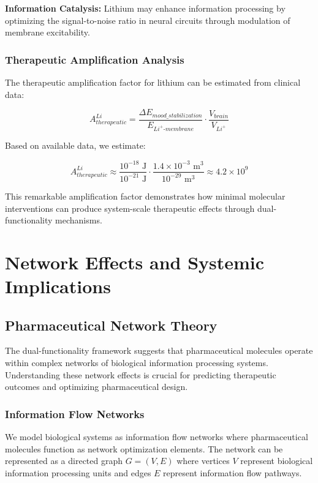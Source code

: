 \documentclass[12pt,a4paper]{article}
\begin{document}
\textbf{Information Catalysis:} Lithium may enhance information processing by optimizing the signal-to-noise ratio in neural circuits through modulation of membrane excitability.

\subsubsection{Therapeutic Amplification Analysis}

The therapeutic amplification factor for lithium can be estimated from clinical data:

$$A_{therapeutic}^{Li} = \frac{\Delta E_{mood\_stabilization}}{E_{Li^+ \text{-}membrane}} \cdot \frac{V_{brain}}{V_{Li^+}}$$

Based on available data, we estimate:

$$A_{therapeutic}^{Li} \approx \frac{10^{-18} \text{ J}}{10^{-21} \text{ J}} \cdot \frac{1.4 \times 10^{-3} \text{ m}^3}{10^{-29} \text{ m}^3} \approx 4.2 \times 10^{9}$$

This remarkable amplification factor demonstrates how minimal molecular interventions can produce system-scale therapeutic effects through dual-functionality mechanisms.

\section{Network Effects and Systemic Implications}

\subsection{Pharmaceutical Network Theory}

The dual-functionality framework suggests that pharmaceutical molecules operate within complex networks of biological information processing systems. Understanding these network effects is crucial for predicting therapeutic outcomes and optimizing pharmaceutical design.

\subsubsection{Information Flow Networks}

We model biological systems as information flow networks where pharmaceutical molecules function as network optimization elements. The network can be represented as a directed graph $G = (V, E)$ where vertices $V$ represent biological information processing units and edges $E$ represent information flow pathways.
\end{document}
